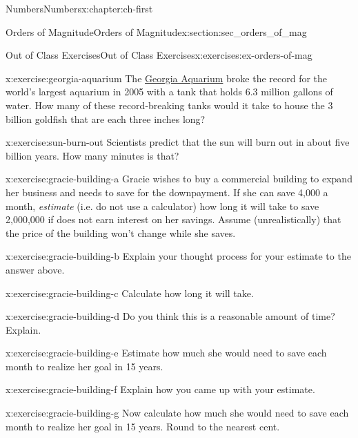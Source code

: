 \documentclass[twoside,10pt,]{book}
\numberwithin{equation}{chapter}
\begin{document}
\begin{chapterptx}{Numbers}{}{Numbers}{}{}{x:chapter:ch-first}
\begin{sectionptx}{Orders of Magnitude}{}{Orders of Magnitude}{}{}{x:section:sec_orders_of_mag}
\begin{exercises-subsection-numberless}{Out of Class Exercises}{}{Out of Class Exercises}{}{}{x:exercises:ex-orders-of-mag}
\begin{divisionexercise}{2}{}{}{x:exercise:georgia-aquarium}
The \href{https://www.georgiaaquarium.org/}{Georgia Aquarium}\footnotemark{} broke the record for the world's largest aquarium in 2005 with a tank that holds 6.3 million gallons of water.  How many of these record-breaking tanks would it take to house the 3 billion goldfish that are each three inches long?\end{divisionexercise}%
%
\begin{divisionexercise}{3}{}{}{x:exercise:sun-burn-out}%
Scientists predict that the sun will burn out in about five billion years.  How many minutes is that?\end{divisionexercise}%
\begin{divisionexercise}{4}{}{}{x:exercise:gracie-building-a}%
Gracie wishes to buy a commercial building to expand her business and needs to save for the downpayment.  If she can save \textdollar{}4,000 a month, \emph{estimate} (i.e. do not use a calculator) how long it will take to save \textdollar{}2,000,000 if does not earn interest on her savings.  Assume (unrealistically) that the price of the building won't change while she saves.\end{divisionexercise}%
\begin{divisionexercise}{5}{}{}{x:exercise:gracie-building-b}%
Explain your thought process for your estimate to the answer above.\end{divisionexercise}%
\begin{divisionexercise}{6}{}{}{x:exercise:gracie-building-c}%
Calculate how long it will take.\end{divisionexercise}%
\begin{divisionexercise}{7}{}{}{x:exercise:gracie-building-d}%
Do you think this is a reasonable amount of time? Explain.\end{divisionexercise}%
\begin{divisionexercise}{8}{}{}{x:exercise:gracie-building-e}%
Estimate how much she would need to save each month to realize her goal in 15 years.\end{divisionexercise}%
\begin{divisionexercise}{9}{}{}{x:exercise:gracie-building-f}%
Explain how you came up with your estimate.\end{divisionexercise}%
\begin{divisionexercise}{10}{}{}{x:exercise:gracie-building-g}%
Now calculate how much she would need to save each month to realize her goal in 15 years.  Round to the nearest cent.\end{divisionexercise}%

\end{exercises-subsection-numberless}
\end{sectionptx}
\end{chapterptx}
\end{document}
